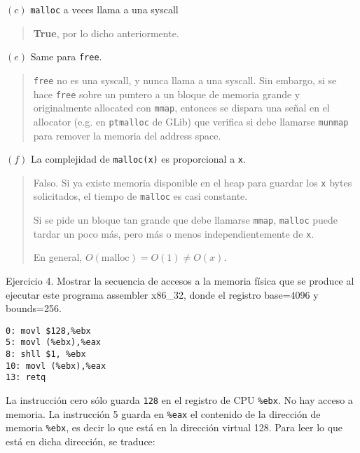 \documentclass[12pt]{article}
\theoremstyle{definition}
\begin{document}
$(c)$ \texttt{malloc} a veces llama a una syscall 


\small
\begin{quote}

\textbf{True}, por lo dicho anteriormente.

\end{quote}
\normalsize

$(e)$ Same para \texttt{free}.


\small
\begin{quote}

\texttt{free} no es una syscall, y nunca llama a una syscall. Sin embargo, si se
hace \texttt{free} sobre un puntero a un bloque de memoria grande y
originalmente allocated con \texttt{mmap}, entonces se dispara una señal en el
allocator (e.g. en \texttt{ptmalloc} de GLib) que verifica si debe llamarse
\texttt{munmap} para remover la memoria del address space.

\end{quote}
\normalsize

$(f)$ La complejidad de \texttt{malloc(x)} es proporcional a \texttt{x}.


\small
\begin{quote}

Falso. Si ya existe memoria disponible en el heap para guardar los \texttt{x}
bytes solicitados, el tiempo de \texttt{malloc} es casi constante. 

Si se pide un bloque tan grande que debe llamarse \texttt{mmap}, \texttt{malloc}
puede tardar un poco más, pero más o menos independientemente de \texttt{x}. 

En general, $O(\text{malloc}) = O(1) \neq O(x)$.

\end{quote}
\normalsize

\pagebreak 

\begin{shaded}
Ejercicio 4. Mostrar la secuencia de accesos a la memoria física que se produce
al ejecutar este programa assembler x86\_32, donde el registro base=4096 y
bounds=256.

\begin{lstlisting}[language=assembler]
0: movl $128,%ebx
5: movl (%ebx),%eax
8: shll $1, %ebx
10: movl (%ebx),%eax
13: retq
\end{lstlisting}
\end{shaded}

La instrucción cero sólo guarda \texttt{128} en el registro de CPU
\texttt{\%ebx}. No hay acceso a memoria. La instrucción 5 guarda en
\texttt{\%eax} el contenido de la dirección de memoria \texttt{\%ebx}, es
decir lo que está en la dirección virtual 128. Para leer lo que está en dicha
dirección, se traduce: 
\end{document}

